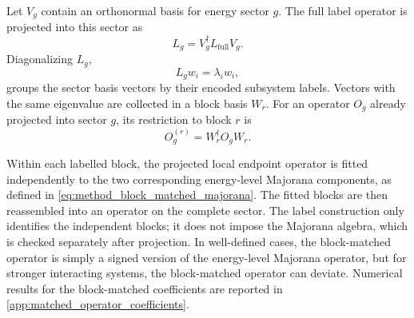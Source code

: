 Let \(V_g\) contain an orthonormal basis for energy sector \(g\). The full
label operator is projected into this sector as
\begin{equation}
  L_g
  =
  V_g^{\dagger}L_{\mathrm{full}}V_g.
\end{equation}
Diagonalizing \(L_g\),
\begin{equation}
  L_g w_i=\lambda_i w_i,
\end{equation}
groups the sector basis vectors by their encoded subsystem labels. Vectors
with the same eigenvalue are collected in a block basis \(W_r\). For an
operator \(O_g\) already projected into sector \(g\), its restriction to block
\(r\) is
\begin{equation}
  O_g^{(r)}
  =
  W_r^{\dagger}O_g W_r.
\end{equation}

Within each labelled block, the projected local endpoint operator is fitted
independently to the two corresponding energy-level Majorana components, as
defined in \cref{eq:method_block_matched_majorana}. The fitted blocks are then
reassembled into an operator on the complete sector. The label construction
only identifies the independent blocks; it does not impose the Majorana
algebra, which is checked separately after projection.
In well-defined cases, the block-matched operator is simply a signed version of the energy-level Majorana operator, but for stronger interacting systems, the block-matched operator can deviate. Numerical results for the block-matched coefficients are reported in \cref{app:matched_operator_coefficients}.

